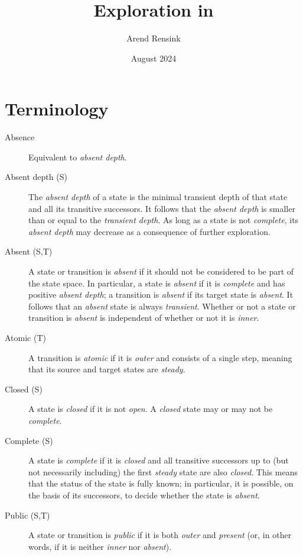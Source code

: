 \documentclass{article}
\begin{document}
\title{Exploration in \GROOVE}
\author{Arend Rensink}
\date{August 2024}
\maketitle

\section*{Terminology}

\begin{description}
\item[Absence] Equivalent to \emph{absent depth}.

\item[Absent depth (S)] The \emph{absent depth} of a state is the minimal transient depth of that state and all its transitive successors. It follows that the \emph{absent depth} is smaller than or equal to the \emph{transient depth}. As long as a state is not \emph{complete}, its \emph{absent depth} may decrease as a consequence of further exploration.

\item[Absent (S,T)] A state or transition is \emph{absent} if it should not be considered to be part of the state space. In particular, a state is \emph{absent} if it is \emph{complete} and has positive \emph{absent depth}; a transition is \emph{absent} if its target state is \emph{absent}. It follows that an \emph{absent} state is always \emph{transient}. Whether or not a state or transition is \emph{absent} is independent of whether or not it is \emph{inner}.

\item[Atomic (T)] A transition is \emph{atomic} if it is \emph{outer} and consists of a single step, meaning that its source and target states are \emph{steady}.

\item[Closed (S)] A state is \emph{closed} if it is not \emph{open}. A \emph{closed} state may or may not be \emph{complete}.

\item[Complete (S)] A state is \emph{complete} if it is \emph{closed} and all transitive successors up to (but not necessarily including) the first \emph{steady} state are also \emph{closed}. This means that the status of the state is fully known; in particular, it is possible, on the basis of its successors, to decide whether the state is \emph{absent}.

\item[Public (S,T)] A state or transition is \emph{public} if it is both \emph{outer} and \emph{present} (or, in other words, if it is neither \emph{inner} nor \emph{absent}).


\end{description}
\end{document}

